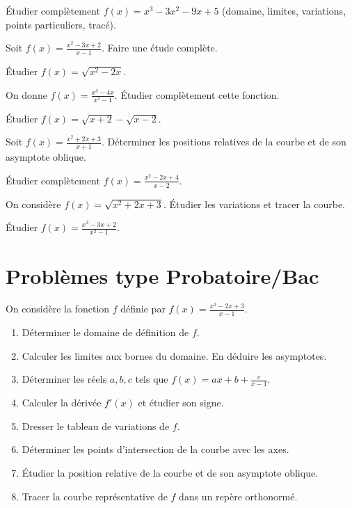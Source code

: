 
\exo{}
Étudier complètement \(f(x)=x^3-3x^2-9x+5\) (domaine, limites, variations, points particuliers, tracé).

\exo{}
Soit \(f(x)=\frac{x^2-3x+2}{x-1}\). Faire une étude complète.

\exo{}
Étudier \(f(x)=\sqrt{x^2-2x}\).

\exo{}
On donne \(f(x)=\frac{x^3-4x}{x^2-1}\). Étudier complètement cette fonction.

\exo{}
Étudier \(f(x)=\sqrt{x+2}-\sqrt{x-2}\).

\exo{}
Soit \(f(x)=\frac{x^2+2x+3}{x+1}\). Déterminer les positions relatives de la courbe et de son asymptote oblique.

\exo{}
Étudier complètement \(f(x)=\frac{x^2-2x+4}{x-2}\).

\exo{}
On considère \(f(x)=\sqrt{x^2+2x+3}\). Étudier les variations et tracer la courbe.

\exo{}
Étudier \(f(x)=\frac{x^3-3x+2}{x^2-1}\).

\section{Problèmes type Probatoire/Bac}

On considère la fonction \(f\) définie par \(f(x)=\frac{x^2-2x+3}{x-1}\).
\begin{enumerate}[label=\arabic*)]
\item Déterminer le domaine de définition de \(f\).
\item Calculer les limites aux bornes du domaine. En déduire les asymptotes.
\item Déterminer les réels \(a,b,c\) tels que \(f(x)=ax+b+\frac{c}{x-1}\).
\item Calculer la dérivée \(f'(x)\) et étudier son signe.
\item Dresser le tableau de variations de \(f\).
\item Déterminer les points d'intersection de la courbe avec les axes.
\item Étudier la position relative de la courbe et de son asymptote oblique.
\item Tracer la courbe représentative de \(f\) dans un repère orthonormé.
\end{enumerate}

